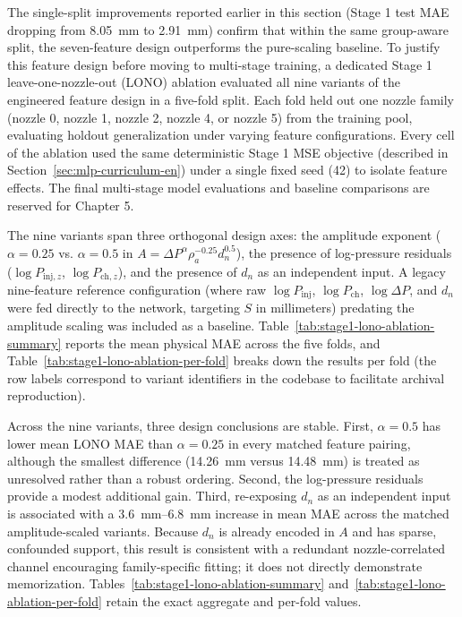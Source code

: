 The single-split improvements reported earlier in this section (Stage 1 test MAE dropping from \SI{8.05}{mm} to \SI{2.91}{mm}) confirm that within the same group-aware split, the seven-feature design outperforms the pure-scaling baseline. To justify this feature design before moving to multi-stage training, a dedicated Stage 1 leave-one-nozzle-out (LONO) ablation evaluated all nine variants of the engineered feature design in a five-fold split. Each fold held out one nozzle family (nozzle 0, nozzle 1, nozzle 2, nozzle 4, or nozzle 5) from the training pool, evaluating holdout generalization under varying feature configurations. Every cell of the ablation used the same deterministic Stage 1 MSE objective (described in Section~\ref{sec:mlp-curriculum-en}) under a single fixed seed (42) to isolate feature effects. The final multi-stage model evaluations and baseline comparisons are reserved for Chapter 5.

The nine variants span three orthogonal design axes: the amplitude exponent (\(\alpha=0.25\) vs. \(\alpha=0.5\) in \(A=\Delta P^{\alpha}\rho_a^{-0.25}d_n^{0.5}\)), the presence of log-pressure residuals (\(\log P_{\mathrm{inj},z}\), \(\log P_{\mathrm{ch},z}\)), and the presence of \(d_n\) as an independent input. A legacy nine-feature reference configuration (where raw \(\log P_{\mathrm{inj}}\), \(\log P_{\mathrm{ch}}\), \(\log\Delta P\), and \(d_n\) were fed directly to the network, targeting \(S\) in millimeters) predating the amplitude scaling was included as a baseline. Table~\ref{tab:stage1-lono-ablation-summary} reports the mean physical MAE across the five folds, and Table~\ref{tab:stage1-lono-ablation-per-fold} breaks down the results per fold (the row labels correspond to variant identifiers in the codebase to facilitate archival reproduction).

Across the nine variants, three design conclusions are stable. First, \(\alpha=0.5\) has lower mean LONO MAE than \(\alpha=0.25\) in every matched feature pairing, although the smallest difference (\SI{14.26}{mm} versus \SI{14.48}{mm}) is treated as unresolved rather than a robust ordering. Second, the log-pressure residuals provide a modest additional gain. Third, re-exposing \(d_n\) as an independent input is associated with a \SIrange{3.6}{6.8}{mm} increase in mean MAE across the matched amplitude-scaled variants. Because \(d_n\) is already encoded in \(A\) and has sparse, confounded support, this result is consistent with a redundant nozzle-correlated channel encouraging family-specific fitting; it does not directly demonstrate memorization. Tables~\ref{tab:stage1-lono-ablation-summary} and~\ref{tab:stage1-lono-ablation-per-fold} retain the exact aggregate and per-fold values.

